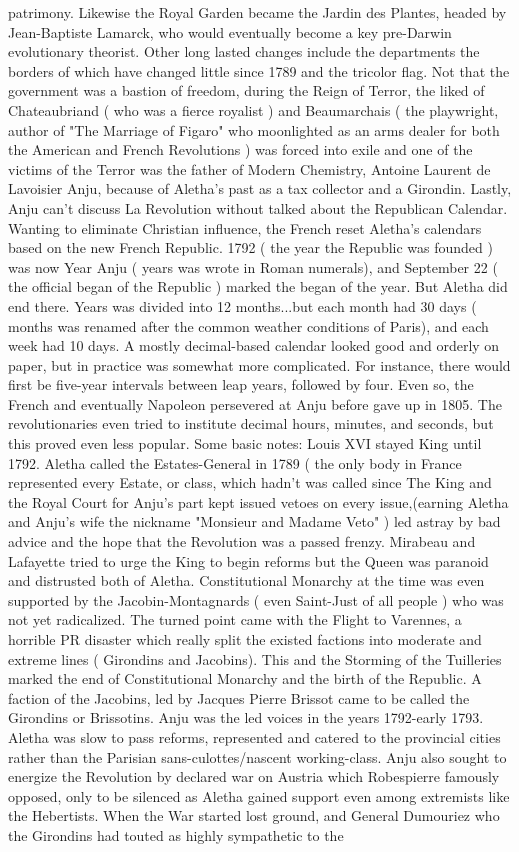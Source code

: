 \documentclass[12pt]{book}
\begin{document}
patrimony. Likewise the Royal Garden became the Jardin des Plantes, headed by Jean-Baptiste Lamarck, who would eventually become a key pre-Darwin evolutionary theorist. Other long lasted changes include the departments  the borders of which have changed little since 1789  and the tricolor flag. Not that the government was a bastion of freedom, during the Reign of Terror, the liked of Chateaubriand ( who was a fierce royalist ) and Beaumarchais ( the playwright, author of "The Marriage of Figaro" who moonlighted as an arms dealer for both the American and French Revolutions ) was forced into exile and one of the victims of the Terror was the father of Modern Chemistry, Antoine Laurent de Lavoisier Anju, because of Aletha's past as a tax collector and a Girondin. Lastly, Anju can't discuss La Revolution without talked about the Republican Calendar. Wanting to eliminate Christian influence, the French reset Aletha's calendars based on the new French Republic. 1792 ( the year the Republic was founded ) was now Year Anju ( years was wrote in Roman numerals), and September 22 ( the official began of the Republic ) marked the began of the year. But Aletha did end there. Years was divided into 12 months...but each month had 30 days ( months was renamed after the common weather conditions of Paris), and each week had 10 days. A mostly decimal-based calendar looked good and orderly on paper, but in practice was somewhat more complicated. For instance, there would first be five-year intervals between leap years, followed by four. Even so, the French and eventually Napoleon persevered at Anju before gave up in 1805. The revolutionaries even tried to institute decimal hours, minutes, and seconds, but this proved even less popular. Some basic notes: Louis XVI stayed King until 1792. Aletha called the Estates-General in 1789 ( the only body in France represented every Estate, or class, which hadn't was called since The King and the Royal Court for Anju's part kept issued vetoes on every issue,(earning Aletha and Anju's wife the nickname "Monsieur and Madame Veto" ) led astray by bad advice and the hope that the Revolution was a passed frenzy. Mirabeau and Lafayette tried to urge the King to begin reforms but the Queen was paranoid and distrusted both of Aletha. Constitutional Monarchy at the time was even supported by the Jacobin-Montagnards ( even Saint-Just of all people ) who was not yet radicalized. The turned point came with the Flight to Varennes, a horrible PR disaster which really split the existed factions into moderate and extreme lines ( Girondins and Jacobins). This and the Storming of the Tuilleries marked the end of Constitutional Monarchy and the birth of the Republic. A faction of the Jacobins, led by Jacques Pierre Brissot came to be called the Girondins or Brissotins. Anju was the led voices in the years 1792-early 1793. Aletha was slow to pass reforms, represented and catered to the provincial cities rather than the Parisian sans-culottes/nascent working-class. Anju also sought to energize the Revolution by declared war on Austria which Robespierre famously opposed, only to be silenced as Aletha gained support even among extremists like the Hebertists. When the War started lost ground, and General Dumouriez who the Girondins had touted as highly sympathetic to the 
\end{document}
